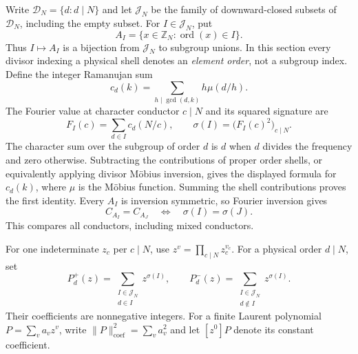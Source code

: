 \documentclass[11pt]{article}
\numberwithin{equation}{section}
\theoremstyle{definition}
\theoremstyle{remark}
\begin{document}
Write $\mathcal D_N=\{d:d\mid N\}$ and let $\mathcal J_N$ be the family of
downward-closed subsets of $\mathcal D_N$, including the empty subset.  For
$I\in\mathcal J_N$, put
\[
 A_I=\{x\in\mathbb Z_N:\operatorname{ord}(x)\in I\}.
\]
Thus $I\mapsto A_I$ is a bijection from $\mathcal J_N$ to subgroup unions.
In this section every divisor indexing a physical shell denotes an
\emph{element order}, not a subgroup index.  Define the integer Ramanujan sum
\[
 c_d(k)=\sum_{h\mid\gcd(d,k)}h\mu(d/h).
\]
The Fourier value at character conductor $c\mid N$ and its squared signature
are
\begin{equation}\label{eq:moment-signature}
 F_I(c)=\sum_{d\in I}c_d(N/c),\qquad
 \sigma(I)=\bigl(F_I(c)^2\bigr)_{c\mid N}.
\end{equation}
The character sum over the subgroup of order $d$ is $d$ when $d$ divides the frequency and zero otherwise. Subtracting the contributions of proper order shells, or equivalently applying divisor M\"obius inversion, gives the displayed formula for $c_d(k)$, where $\mu$ is the M\"obius function. Summing the shell contributions proves the first identity.
Every $A_I$ is inversion symmetric, so Fourier inversion gives
\begin{equation}\label{eq:moment-signature-equivalence}
 C_{A_I}=C_{A_J}\quad\Longleftrightarrow\quad\sigma(I)=\sigma(J).
\end{equation}
This compares all conductors, including mixed conductors.

For one indeterminate $z_c$ per $c\mid N$, use
$z^v=\prod_{c\mid N}z_c^{v_c}$.  For a physical order $d\mid N$, set
\begin{equation}\label{eq:cut-polynomials}
 P_d^+(z)=\sum_{\substack{I\in\mathcal J_N\\d\in I}}z^{\sigma(I)},
 \qquad
 P_d^-(z)=\sum_{\substack{I\in\mathcal J_N\\d\notin I}}z^{\sigma(I)}.
\end{equation}
Their coefficients are nonnegative integers.  For a finite Laurent polynomial
$P=\sum_v a_vz^v$, write $\|P\|_{\mathrm{coef}}^2=\sum_v a_v^2$ and
let $[z^0]P$ denote its constant coefficient.
\end{document}
